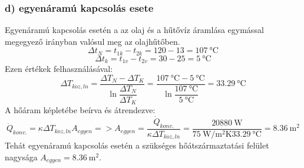 \subsubsection*{d) egyenáramú kapcsolás esete }
Egyenáramú kapcsolás esetén a az olaj és a hűtővíz áramlása egymással megegyező irányban valósul meg az olajhűtőben. 
\begin{equation}
\Delta t_N =  t_{1k} - t_{2k} = 120 - 13 =\SI{107}{\celsius}
\end{equation}
\begin{equation}
\Delta t_k =  t_{1v} - t_{2v} = 30 - 25 =\SI{5}{\celsius}
\end{equation}
Ezen értékek felhasználásával:
\begin{equation}
\Delta T_{k\ddot{o}z,ln} 
= 
\dfrac{\Delta T_N - \Delta T_K}{\ln\dfrac{\Delta T_N}{\Delta T_K}} 
= 
\dfrac{\SI{107}{\celsius} - \SI{5}{\celsius}}{\ln\dfrac{\SI{107}{\celsius}}{\SI{5}{\celsius}}} 
= 
\SI{33,29}{\celsius}
\end{equation}
A hőáram képletébe beírva és átrendezve:
\begin{equation}
\dot{Q}_{konv.} = \kappa \Delta T_{k\ddot{o}z,ln} A_{egyen} => A_{egyen} = \dfrac{\dot{Q}_{konv.}}{\kappa \Delta T_{k\ddot{o}z,ln}} = \dfrac{\SI{20880}{\watt}}{\SI{75}{\watt\per\meter\squared\kelvin} \SI{33,29}{\celsius}} = \SI{8,36}{\meter\squared}
\end{equation}
Tehát egyenáramú kapcsolás esetén a szükséges hőátszármaztatási felület nagysága $A_{egyen} = \SI{8,36}{\meter\squared}$.


\pagebreak